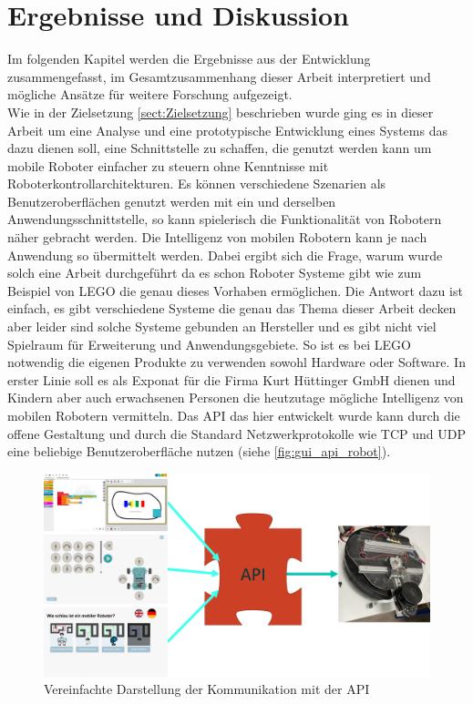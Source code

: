 \chapter{Ergebnisse und Diskussion}

Im folgenden Kapitel werden die Ergebnisse aus der Entwicklung zusammengefasst, im Gesamtzusammenhang dieser Arbeit interpretiert und mögliche Ansätze für weitere Forschung aufgezeigt. \\

 Wie in der Zielsetzung \autoref{sect:Zielsetzung} beschrieben wurde ging es in dieser Arbeit um eine Analyse und eine prototypische Entwicklung eines Systems das dazu dienen soll, eine Schnittstelle zu schaffen, die genutzt werden kann um mobile Roboter einfacher zu steuern ohne Kenntnisse mit Roboterkontrollarchitekturen. Es können verschiedene Szenarien als Benutzeroberflächen genutzt werden mit ein und derselben Anwendungsschnittstelle, so kann spielerisch die Funktionalität von Robotern näher gebracht werden. Die Intelligenz von mobilen Robotern kann je nach Anwendung so übermittelt werden. Dabei ergibt sich die Frage, warum wurde solch eine Arbeit durchgeführt da es schon Roboter Systeme gibt wie zum Beispiel von LEGO die genau dieses Vorhaben ermöglichen. Die Antwort dazu ist einfach, es gibt verschiedene Systeme die genau das Thema dieser Arbeit decken aber leider sind solche Systeme gebunden an Hersteller und es gibt nicht viel Spielraum für Erweiterung und Anwendungsgebiete. So ist es bei LEGO notwendig die eigenen Produkte zu verwenden sowohl Hardware oder Software. In erster Linie soll es als Exponat für die Firma Kurt Hüttinger GmbH dienen und Kindern aber auch erwachsenen Personen die heutzutage mögliche Intelligenz von mobilen Robotern vermitteln. Das API das hier entwickelt wurde kann durch die offene Gestaltung und durch die Standard Netzwerkprotokolle wie TCP und UDP eine beliebige Benutzeroberfläche nutzen (siehe \autoref{fig:gui_api_robot}). 
 
 \begin{figure}[H]
 \centering
 \includegraphics[width=\linewidth]{Bilder/Ergebnisse/gui_api_robot.png}
 \caption{Vereinfachte Darstellung der Kommunikation mit der API}
 \label{fig:gui_api_robot}
\end{figure}
 
